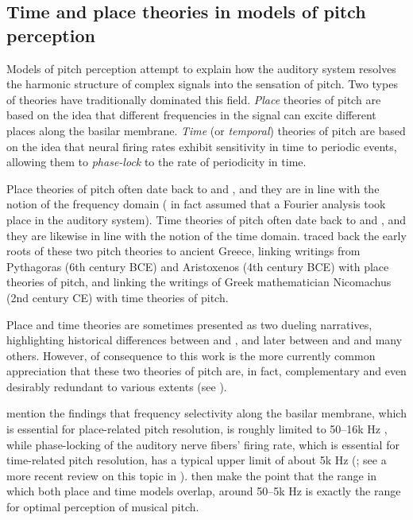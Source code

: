 \subsection{Time and place theories in models of pitch perception}\label{sec:dualismPitch}

Models of pitch perception attempt to explain how the auditory system resolves the harmonic structure of complex signals into the sensation of pitch.
Two types of theories have traditionally dominated this field.
\emph{Place} theories of pitch are based on the idea that different frequencies in the signal can excite different places along the basilar membrane. \emph{Time} (or \emph{temporal}) theories of pitch are based on the idea that neural firing rates exhibit sensitivity in time to periodic events, allowing them to \emph{phase-lock} to the rate of periodicity in time.

Place theories of pitch often date back to \citet{ohm1843annalensk} and \citet{helmholtz1863lehresk}, and they are in line with the notion of the frequency domain (\citealt{ohm1843annalensk} in fact assumed that a Fourier analysis took place in the auditory system). Time theories of pitch often date back to \citet{seebeck1841annalensk, wever1930nature} and \citet{schouten1938perception}, and they are likewise in line with 
the notion of the time domain.
\citet{de2005pitch} traced back the early roots of these two pitch theories to ancient Greece, linking writings from Pythagoras (6th century BCE) and Aristoxenos (4th century BCE) with place theories of pitch, and linking the writings of Greek mathematician Nicomachus (2nd century CE) with time theories of pitch.

Place and time theories are sometimes presented as two dueling narratives, highlighting historical differences between \citet{seebeck1841annalensk} and \citet{ohm1843annalensk}, and later between \citet{helmholtz1863lehresk} and \citet{schouten1938perception} and many others. However, of consequence to this work is the more currently common appreciation that these two theories of pitch are, in fact, complementary and even desirably redundant to various extents (see \citealt{house1990tonal, de2005pitch, houtsma1995pitch, oxenham2013revisiting}).

\begin{sloppypar}
\citet{warren1981perception} mention the findings that frequency selectivity along the basilar membrane, which is essential for place-related pitch resolution, is roughly limited to 50--16k Hz \citep{bekesy1960experiments}, while phase-locking of the auditory nerve fibers' firing rate, which is essential for time-related pitch resolution, has a typical upper limit of about 5k Hz (\citealt{rose1967phase}; see a more recent review on this topic in \citealt{verschooten2019upper}).
\citet{warren1981perception} then make the point that the range in which both place and time models overlap, around 50--5k Hz is exactly the range for optimal perception of musical pitch.
\end{sloppypar}

